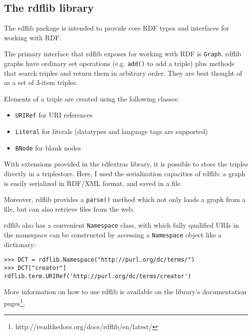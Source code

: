 \documentclass[a4paper,11pt]{report}
\begin{document}
\subsection{The rdflib library}
The rdflib package is intended to provide core RDF types and interfaces for working with RDF. 

The primary interface that rdflib exposes for working with RDF is \texttt{Graph}. rdflib graphs have ordinary set operations (e.g. \texttt{add()} to add a triple) plus methods that search triples and return them in arbitrary order. They are best thought of as a set of 3-item triples. 

Elements of a triple are created using the following classes:
\begin{itemize}
\item \texttt{URIRef} for URI references
\item \texttt{Literal} for literals (datatypes and language tags are supported)
\item \texttt{BNode} for blank nodes
\end{itemize}

With extensions provided in the rdfextras library, it is possible to store the triples directly in a triplestore. Here, I used the serialization capacities of rdflib: a graph is easily serialized in RDF/XML format, and saved in a file.

 Moreover, rdflib provides a \texttt{parse()} method which not only loads a graph from a file, but can also retrieve files from the web. 

rdflib also has a convenient \texttt{Namespace} class, with which fully qualified URIs in the namespace can be constructed by accessing a \texttt{Namespace} object like a dictionary:
\begin{verbatim}
>>> DCT = rdflib.Namespace("http://purl.org/dc/terms/")
>>> DCT["creator"]
rdflib.term.URIRef('http://purl.org/dc/terms/creator')
\end{verbatim}

More information on how to use rdflib is available on the library's documentation pages\footnote{http://readthedocs.org/docs/rdflib/en/latest/}.
\end{document}
